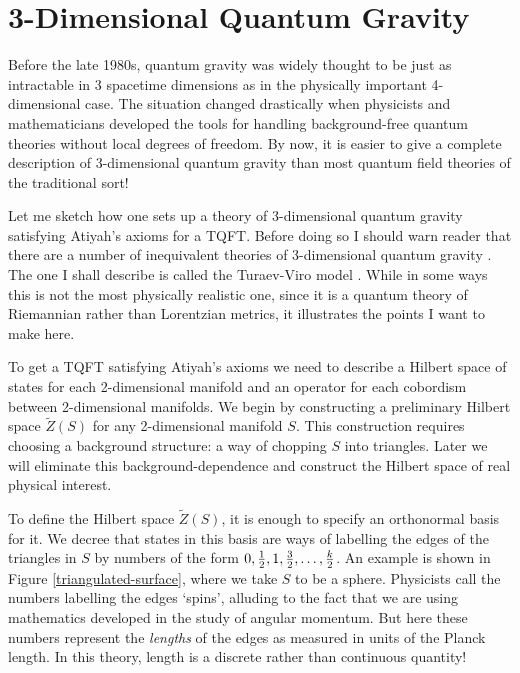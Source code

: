 \section{3-Dimensional Quantum Gravity} \label{3dQG}

Before the late 1980s, quantum gravity was widely thought to be just as
intractable in 3 spacetime dimensions as in the physically important
4-dimensional case.  The situation changed drastically when physicists
and mathematicians developed the tools for handling background-free
quantum theories without local degrees of freedom.  By now, it is easier
to give a complete description of 3-dimensional quantum gravity than
most quantum field theories of the traditional sort!   

Let me sketch how one sets up a theory of 3-dimensional quantum gravity
satisfying Atiyah's axioms for a TQFT.    Before doing so I should warn
reader that there are a number of inequivalent theories of 3-dimensional
quantum gravity \cite{Carlip}.  The one I shall describe is called the
Turaev-Viro model \cite{Turaev}.   While in some ways this is not the
most physically realistic one, since it is a quantum theory of Riemannian
rather than Lorentzian metrics, it illustrates the points I want to make
here.  

To get a TQFT satisfying Atiyah's axioms we need to describe a Hilbert
space of states for each 2-dimensional manifold and an operator for each
cobordism between 2-dimensional manifolds.  We begin by constructing a
preliminary Hilbert space $\tilde{Z}(S)$ for any 2-dimensional manifold 
$S$.  This construction requires choosing a background structure: a way
of chopping $S$ into triangles.   Later we will eliminate this
background-dependence and construct the Hilbert space of real physical
interest.   

To define the Hilbert space $\tilde{Z}(S)$, it is enough to specify an
orthonormal basis for it.  We decree that states in this basis are ways
of labelling the edges of the triangles in $S$ by numbers of the form
$0,{1\over 2},1,{3\over 2},\dots,{k\over 2}$.  An example is shown in 
Figure \ref{triangulated-surface}, where we take $S$ to be a sphere.   
Physicists call the numbers labelling the edges `spins',
alluding to the fact that we are using mathematics developed in the
study of angular momentum.  But here these numbers represent the {\it
lengths} of the edges as measured in units of the Planck length.  In
this theory, length is a discrete rather than continuous quantity!   

